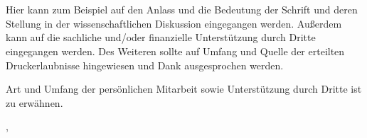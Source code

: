 \section*{\preamblename}\label{sec:\preamblename}


Hier kann zum Beispiel auf den Anlass und die Bedeutung der Schrift und deren Stellung in der wissenschaftlichen Diskussion eingegangen werden.
Außerdem kann auf die sachliche und/oder finanzielle Unterstützung durch Dritte eingegangen werden.
Des Weiteren sollte auf Umfang und Quelle der erteilten Druckerlaubnisse hingewiesen und Dank ausgesprochen werden.

Art und Umfang der persönlichen Mitarbeit sowie Unterstützung durch Dritte ist zu erwähnen.


\vspace{0.5cm}
\begingroup
\raggedright{\preamblelocation, \preambledate}
\hfill
\raggedleft{\textit{\thesisauthor}}
\endgroup

\newpage